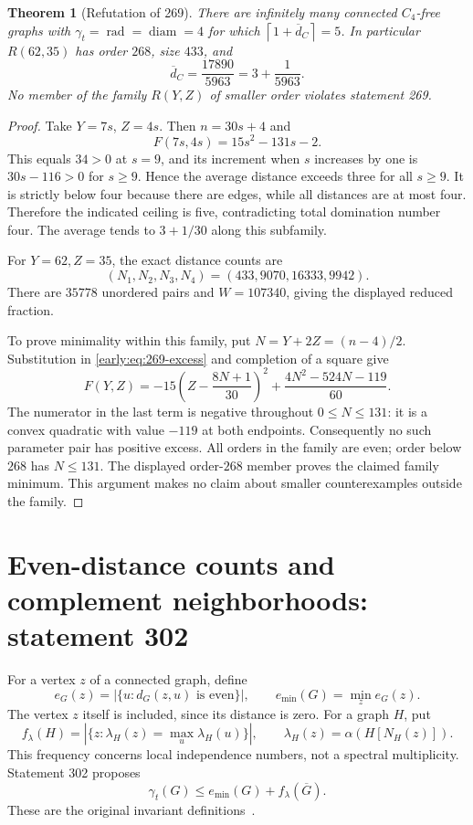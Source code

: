\documentclass[11pt,a4paper]{article}
\newtheorem{theorem}{Theorem}[section]
\theoremstyle{definition}\newtheorem{definition}[theorem]{Definition}
\theoremstyle{remark}\newtheorem{remark}[theorem]{Remark}
\newcommand{\rad}{\operatorname{rad}}
\newcommand{\diam}{\operatorname{diam}}
\newcommand{\ceil}[1]{\left\lceil#1\right\rceil}
\begin{document}
\begin{theorem}[Refutation of 269]
\label{early:thm:269-counterexamples}
There are infinitely many connected $C_4$-free graphs with
$\gamma_t=\rad=\diam=4$ for which
$\ceil{1+\overline d_C}=5$.  In particular $R(62,35)$ has order
$268$, size $433$, and
\[
 \overline d_C=\frac{17890}{5963}=3+\frac1{5963}.
\]
No member of the family $R(Y,Z)$ of smaller order violates
statement 269.
\end{theorem}
\begin{proof}
Take $Y=7s$, $Z=4s$.  Then $n=30s+4$ and
\[
 F(7s,4s)=15s^2-131s-2.
\]
This equals $34>0$ at $s=9$, and its increment when $s$ increases
by one is $30s-116>0$ for $s\geq9$.  Hence the average distance
exceeds three for all $s\geq9$.  It is strictly below four because
there are edges, while all distances are at most four.  Therefore
the indicated ceiling is five, contradicting total domination
number four.  The average tends to $3+1/30$ along this subfamily.

For $Y=62,Z=35$, the exact distance counts are
\[
 (N_1,N_2,N_3,N_4)=(433,9070,16333,9942).
\]
There are $35778$ unordered pairs and $W=107340$, giving the
displayed reduced fraction.

To prove minimality within this family, put $N=Y+2Z=(n-4)/2$.
Substitution in \eqref{early:eq:269-excess} and completion of a square
give
\[
 F(Y,Z)=-15\left(Z-\frac{8N+1}{30}\right)^2
       +\frac{4N^2-524N-119}{60}.
\]
The numerator in the last term is negative throughout $0\leq N\leq131$:
it is a convex quadratic with value $-119$ at both endpoints.
Consequently no such parameter pair has positive excess.  All
orders in the family are even; order below $268$ has $N\leq131$.
The displayed order-$268$ member proves the claimed family minimum.
This argument makes no claim about smaller counterexamples outside
the family.
\end{proof}

\section{Even-distance counts and complement neighborhoods: statement 302}
\label{early:sec:302}

For a vertex $z$ of a connected graph, define
\[
 e_G(z)=|\{u:d_G(z,u)\text{ is even}\}|,
 \qquad e_{\min}(G)=\min_z e_G(z).
\]
The vertex $z$ itself is included, since its distance is zero.
For a graph $H$, put
\[
 f_\lambda(H)=
 |\{z:\lambda_H(z)=\max_u\lambda_H(u)\}|,
 \qquad \lambda_H(z)=\alpha(H[N_H(z)]).
\]
This frequency concerns local independence numbers, not a spectral
multiplicity.  Statement 302 proposes
\begin{equation}
 \gamma_t(G)\leq e_{\min}(G)+f_\lambda(\overline G).
 \label{early:eq:302-original}
\end{equation}
These are the original invariant definitions~\cite{src:catalogue,early:glossary}.
\end{document}

